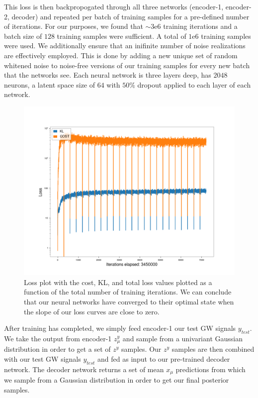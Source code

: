 \documentclass[%
showpacs,
 amsmath,amssymb,
 aps,
 twocolumn,
 prl,
 reprint,
floatfix,
]{revtex4-1}
\begin{document}
This loss is then backpropogated through all three networks 
(encoder-1, encoder-2, decoder) and repeated per batch of 
training samples for a pre-defined number of iterations. For our 
purposes, we found that $\sim3\textrm{e}6$ training iterations and 
a batch size of $128$ training samples were sufficient. A total 
of $1\textrm{e}6$ training samples were used. We additionally 
ensure that an inifinite number of noise realizations are effectively employed. This 
is done by adding a new unique set of random whitened noise to noise-free 
versions of our training samples for every new batch that the networks 
see. Each neural network is three layers deep, has $2048$ neurons, a latent 
space size of $64$ with $50\%$ dropout applied to each layer of each network.

%
%
\begin{figure}
    \includegraphics[width=\columnwidth]{images/losses_logscale.png}
    \caption{\label{fig:loss_log} Loss plot with the cost, KL, 
    and total loss values plotted as a function of the total 
    number of training iterations. We can conclude that our 
    neural networks have converged to their optimal state 
    when the slope of our loss curves are close to zero.}
\end{figure}

%
%
After training has completed, we simply feed encoder-1 our test 
GW signals $y_{test}$. We take the output from encoder-1 $z^{y}_{\mu}$ 
and sample from a univariant Gaussian distribution in order to get 
a set of $z^{y}$ samples. Our $z^{y}$ samples are then combined with our 
test GW signals $y_{test}$ and fed as input to our pre-trained decoder 
network. The decoder network returns a set of mean $x_{\mu}$ predictions 
from which we sample from a Gaussian distribution in order to get 
our final posterior samples.
\end{document}
